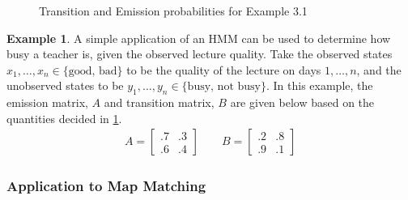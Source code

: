 \documentclass{article}
\numberwithin{equation}{section}
\theoremstyle{definition}
\newtheorem{example}[example]{Example}
\begin{document}
\begin{figure}[h!]
    \centering
    \caption{Transition and Emission probabilities for Example 3.1 }
    \label{TrEm}

\end{figure}
\begin{example} 
A simple application of an HMM can be used to determine how busy a teacher is, given the observed lecture quality. Take the observed states $x_1,\dots,x_n\in \{\text{good, bad}\}$ to be the quality of the lecture on days $1,\dots, n$, and the unobserved states to be $y_1,\dots,y_n\in \{\text{busy, not busy}\}$. In this example, the emission matrix, $A$ and transition matrix, $B$ are given below based on the quantities decided in \ref{TrEm}. 
\begin{align*}
    A = \begin{bmatrix}
    .7 & .3 \\
    .6 & .4 
    \end{bmatrix} \qquad 
     B = \begin{bmatrix}
    .2 & .8 \\
    .9 & .1
    \end{bmatrix} 
\end{align*}

\end{example}







\subsubsection{Application to Map Matching}
\end{document}
